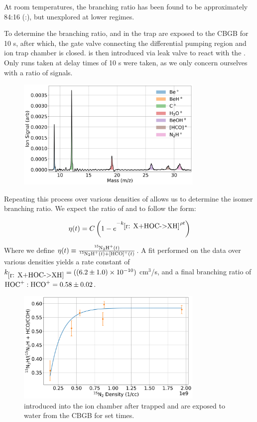 At room temperatures, the branching ratio has been found to be approximately 84:16 (:)\cite{Freeman1987}, but unexplored at lower regimes.

To determine the branching ratio,  and  in the trap are exposed to the CBGB for 10 s, after which, the gate valve connecting the differential pumping region and ion trap chamber is closed.  is then introduced via leak valve to react with the . Only runs taken at delay times of 10 s were taken, as we only concern ourselves with a ratio of signals.

\begin{figure}[H]
	\centering
	\includegraphics[width=0.8\textwidth]{images/C_H2O_15N2.png}
\end{figure}

Repeating this process over various densities of  allows us to determine the isomer branching ratio. We expect the ratio of  and \ce{[HCO]+} to follow the form:

\begin{equation}
	\eta(t) = C \left( 1-e^{-k_{\ref{r: X+HOC->XH}} \rho t} \right)
	\label{eq: N2 asymptote}
\end{equation}

Where we define $\eta(t) \equiv \frac{\ce{^{15}N2H+}(t)}{\ce{^{15}N2H+}(t)+\ce{[HCO]+}(t)}$. A fit performed on the data over various densities yields a rate constant of $k_{\ref{r: X+HOC->XH}} = ((6.2 \pm 1.0) \times 10^{-10})$ cm$^3$/s, and a final branching ratio of $\ce{HOC+}:\ce{HCO+} = 0.58 \pm 0.02$.

\begin{figure}[H]
	\centering
	\label{fig: N2 pressure scan}
	\includegraphics[width=0.8\textwidth]{images/N2_pressure_scan.png}
	\caption{ introduced into the ion chamber after trapped  and  are exposed to water from the CBGB for set times.}
\end{figure}

